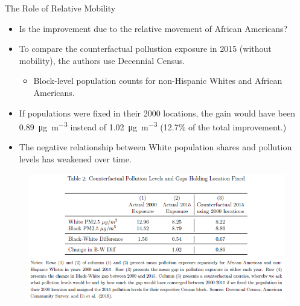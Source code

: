 \documentclass[dvipdfmx,12pt]{beamer}
\begin{document}
\begin{frame}{The Role of Relative Mobility}
  \begin{itemize}
    \item Is the improvement due to the relative movement of African Americans?
    \item To compare the counterfactual pollustion exposure in 2015 (without mobility), the authors use Decennial Census.
    \begin{itemize}
      \item Block-level population counts for non-Hispanic Whites and African Americans.
    \end{itemize}
    \item If populations were fixed in their 2000 locations, the gain would have been \SI[per-mode=symbol]{0.89}{\micro \gram \per \cubic \meter} instead of \SI[per-mode=symbol]{1.02}{\micro \gram \per \cubic \meter} (12.7\% of the total improvement.)
    \item The negative relationship between White population shares and pollution levels has weakened over time.
  \end{itemize}
\end{frame}

\begin{frame}{}
  \begin{figure}
    \centering
    \includegraphics[scale = .7]{T2.png}
  \end{figure}
\end{frame}
\end{document}
